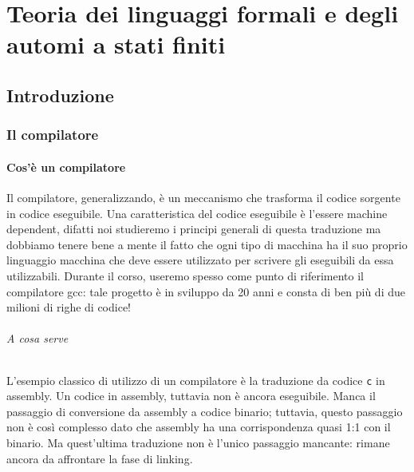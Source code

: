 \documentclass[class=book, crop=false, oneside, 12pt]{standalone}
\begin{document}
\part[Teoria dei linguaggi e degli automi]{Teoria dei linguaggi formali e degli automi a stati finiti}
\chapter{Introduzione}

\section{Il compilatore}
\subsection{Cos'è un compilatore}
Il compilatore, generalizzando, è un meccanismo che trasforma il codice sorgente in codice eseguibile.
Una caratteristica del codice eseguibile è l'essere machine dependent, difatti noi studieremo i principi generali di questa traduzione ma dobbiamo tenere bene a mente il fatto che ogni tipo di macchina ha il suo proprio linguaggio macchina che deve essere utilizzato per scrivere gli eseguibili da essa utilizzabili. Durante il corso, useremo spesso come punto di riferimento il compilatore gcc: tale progetto è in sviluppo da 20 anni e consta di ben più di due milioni di righe di codice!

\paragraph{A cosa serve}
L’esempio classico di utilizzo di un compilatore è la traduzione da codice \texttt{c} in assembly.
Un codice in assembly, tuttavia non è ancora eseguibile. Manca il passaggio di conversione da assembly a codice binario; tuttavia, questo passaggio non è così complesso dato che assembly ha una corrispondenza quasi 1:1 con il binario.
Ma quest’ultima traduzione non è l’unico passaggio mancante: rimane ancora da affrontare la fase di linking.
\end{document}
